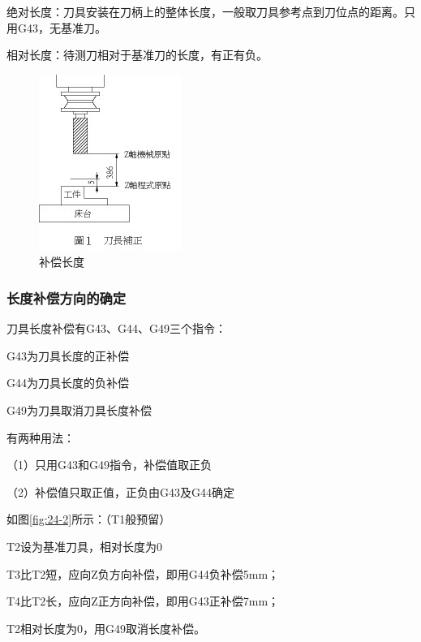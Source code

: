 绝对长度：刀具安装在刀柄上的整体长度，一般取刀具参考点到刀位点的距离。只用G43，无基准刀。

相对长度：待测刀相对于基准刀的长度，有正有负。

\begin{figure}[h]
	\centering
	\includegraphics[width=0.7\linewidth]{data/image/24-1}
	\caption{补偿长度}
	\label{fig:24-1}
\end{figure}

\subsubsection{长度补偿方向的确定}

刀具长度补偿有G43、G44、G49三个指令：

G43为刀具长度的正补偿

G44为刀具长度的负补偿

G49为刀具取消刀具长度补偿

有两种用法：

（1）只用G43和G49指令，补偿值取正负

（2）补偿值只取正值，正负由G43及G44确定

如图\ref{fig:24-2}所示：（T1般预留）

T2设为基准刀具，相对长度为0

T3比T2短，应向Z负方向补偿，即用G44负补偿5mm；

T4比T2长，应向Z正方向补偿，即用G43正补偿7mm；

T2相对长度为0，用G49取消长度补偿。

